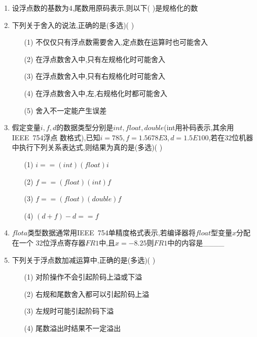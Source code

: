 \documentclass[12pt, a4paper, oneside, UTF8]{ctexbook}
\begin{document}
\begin{enumerate}
    \item 设浮点数的基数为4,尾数用原码表示,则以下(   )是规格化的数 
    \begin{choices}
    \end{choices}
    

    \item 下列关于舍入的说法,正确的是(多选)(   )
    \begin{enumerate}
        \item [(1)] 不仅仅只有浮点数需要舍入,定点数在运算时也可能舍入 
        \item [(2)] 在浮点数舍入中,只有左规格化时可能舍入
        \item [(3)] 在浮点数舍入中,只有右规格化时可能舍入
        \item [(4)] 在浮点数舍入中,左,右规格化时都可能舍入
        \item [(5)] 舍入不一定能产生误差
    \end{enumerate}

    \item \bt 假定变量$i,f,d$的数据类型分别是$int,float,double$(int用补码表示,其余用IEEE\ 754浮点
    数格式),已知$i=785,f=1.5678E3,d=1.5E100$,若在$32$位机器中执行下列关系表达式,则结果为真的是(多选)(   )
    \begin{enumerate}
        \item [(1)] $i==(int)(float)i$ 
        \item [(2)] $f==(float)(int)f$ 
        \item [(3)] $f==(float)(double)f$
        \item [(4)] $(d+f)-d==f$
    \end{enumerate}

    \item \bt $flota$类型数据通常用IEEE\ 754单精度格式表示,若编译器将$float$型变量$x$分配在一个
    32位浮点寄存器$FR1$中,且$x=-8.25$则$FR1$中的内容是\_\_\_\_ 

    \item \bt 下列关于浮点数加减运算中,正确的是(多选)(    )
    \begin{enumerate}
        \item [(1)] 对阶操作不会引起阶码上溢或下溢 
        \item [(2)] 右规和尾数舍入都可以引起阶码上溢 
        \item [(3)] 左规时可能引起阶码下溢 
        \item [(4)] 尾数溢出时结果不一定溢出 
    \end{enumerate}


\end{enumerate}
\end{document}
